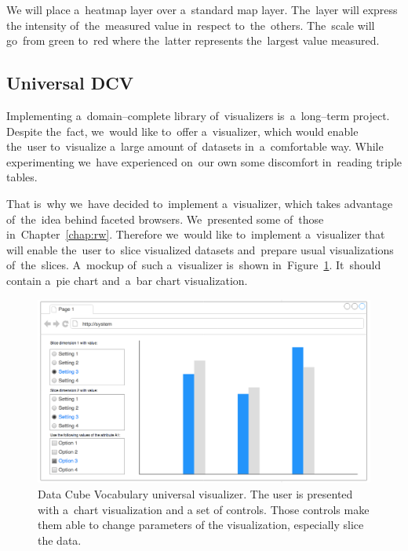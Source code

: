 We will place a~heatmap layer over a~standard map layer. The~layer will express 
the intensity of~the~measured value in~respect to~the~others. The~scale will go~from 
green to~red where the~latter represents the~largest value measured.

\subsection{Universal DCV}
Implementing a~domain--complete library of~visualizers is~a~long--term project. 
Despite the~fact, we~would like to~offer a~visualizer, which would enable the~user to~visualize a~large amount of~datasets in~a~comfortable way. While
experimenting we~have experienced on~our own some discomfort in~reading triple tables.

That is~why we~have decided to~implement a~visualizer, which takes advantage of~the~idea behind faceted browsers. We~presented some of~those in~Chapter~\ref{chap:rw}. Therefore we~would like to~implement a~visualizer that will 
enable the~user to~slice visualized datasets and~prepare usual visualizations of~the~slices. A~mockup of~such a~visualizer is~shown in~Figure~\ref{fig:dcv-universal}. It~should contain a~pie chart and~a~bar chart 
visualization.

\begin{figure}
	\centering
	\includegraphics[width=140mm]{img/dcv-universal.png}
	\caption{Data Cube Vocabulary universal visualizer. The user is presented
	with a~chart visualization and a set of controls. Those controls make them
	able to change parameters of the visualization, especially slice the data.}
	\label{fig:dcv-universal}
\end{figure}



